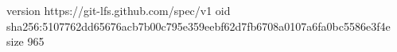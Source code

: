 version https://git-lfs.github.com/spec/v1
oid sha256:5107762dd65676acb7b00c795e359eebf62d7fb6708a0107a6fa0bc5586e3f4e
size 965
